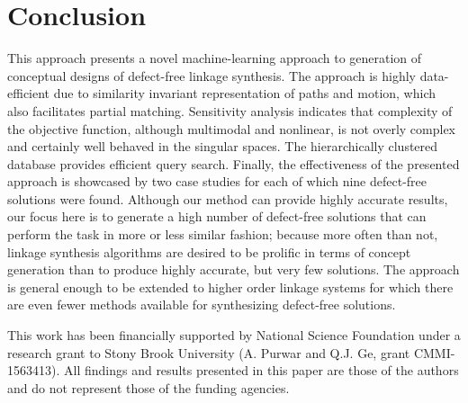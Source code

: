 \documentclass[twocolumn,10pt]{asme2e}
\begin{document}
\section*{Conclusion}
This approach presents a novel machine-learning approach to generation of conceptual designs of defect-free linkage synthesis.
The approach is highly data-efficient due to similarity invariant representation of paths and motion, which also facilitates partial matching.
Sensitivity analysis indicates that complexity of the objective function, although multimodal and nonlinear, is not overly complex and certainly well behaved in the singular spaces.
The hierarchically clustered database provides efficient query search.
Finally, the effectiveness of the presented approach is showcased by two case studies for each of which nine defect-free solutions were found.
Although our method can provide highly accurate results, our focus here is to generate a high number of defect-free solutions that can perform the task in more or less similar fashion;
because more often than not, linkage synthesis algorithms are desired to be prolific in terms of concept generation than to produce highly accurate, but very few solutions. The approach is general enough to be extended to higher order linkage systems for which there are even fewer methods available for synthesizing defect-free solutions.

\begin{acknowledgment}
This work has been financially supported by National Science Foundation under a research grant to Stony Brook University (A. Purwar and Q.J. Ge, grant CMMI-1563413). All findings and results presented in this paper are those of the authors and do not represent those of the funding agencies.
\end{acknowledgment}



\end{document}
